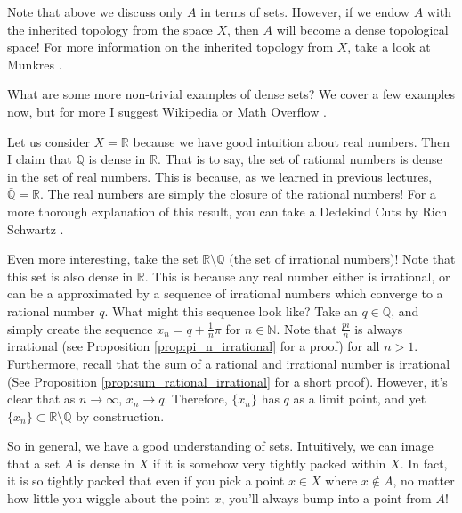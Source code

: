 \documentclass[english, 11pt]{article}
\begin{document}
  \begin{rem}
  Note that above we discuss only $A$ in terms of sets. However, if we endow $A$ with the inherited topology from the space $X$, then $A$ will become a dense topological space! For more information on the inherited topology from $X$, take a look at Munkres \cite{topology_book}.
  \end{rem}

  What are some more non-trivial examples of dense sets? We cover a few examples now, but for more I suggest Wikipedia \cite{wikipedia:dense_set} or Math Overflow \cite{overflow:dense_sets}.

  \begin{exmp}
  Let us consider $X = \mathbb{R}$ because we have good intuition about real numbers. Then I claim that $\mathbb{Q}$ is dense in $\mathbb{R}$. That is to say, the set of rational numbers is dense in the set of real numbers. This is because, as we learned in previous lectures, $\bar{\mathbb{Q}} = \mathbb{R}$. The real numbers are simply the closure of the rational numbers! For a more thorough explanation of this result, you can take a Dedekind Cuts by Rich Schwartz \cite{dedekind_cuts}.
  \end{exmp}

  \begin{exmp}
  Even more interesting, take the set $\mathbb{R} \setminus \mathbb{Q}$ (the set of irrational numbers)! Note that this set is also dense in $\mathbb{R}$. This is because any real number either is irrational, or can be a approximated by a sequence of irrational numbers which converge to a rational number $q$. What might this sequence look like? Take an $q \in \mathbb{Q}$, and simply create the sequence $x_n = q + \frac{1}{n}\pi$ for $n \in \mathbb{N}$. Note that $\frac{pi}{n}$ is always irrational (see Proposition \ref{prop:pi_n_irrational} for a proof) for all $n > 1$. Furthermore, recall that the sum of a rational and irrational number is irrational (See Proposition \ref{prop:sum_rational_irrational} for a short proof). However, it's clear that as $n \to \infty$, $x_n \to q$. Therefore, $\{x_n\}$ has $q$ as a limit point, and yet $\{x_n\} \subset \mathbb{R} \setminus \mathbb{Q}$ by construction.
  \end{exmp}

  So in general, we have a good understanding of  sets. Intuitively, we can image that a set $A$ is dense in $X$ if it is somehow very tightly packed within $X$. In fact, it is so tightly packed that even if you pick a point $x \in X$ where $x \notin A$, no matter how little you wiggle about the point $x$, you'll always bump into a point from $A$!\\
\end{document}
